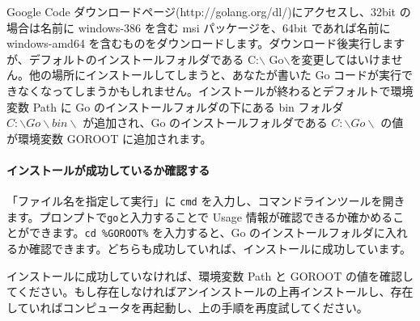 Google Code ダウンロードページ(http:\//\//golang.org\//dl\//)にアクセスし、32bit の場合は名前に windows-386 を含む msi パッケージを、64bit であれば名前に windows-amd64 を含むものをダウンロードします。ダウンロード後実行しますが、デフォルトのインストールフォルダである C:$\backslash$ Go$\backslash$を変更してはいけません。他の場所にインストールしてしまうと、あなたが書いた Go コードが実行できなくなってしまうかもしれません。インストールが終わるとデフォルトで環境変数 Path に Go のインストールフォルダの下にある bin フォルダ $C:\backslash Go\backslash bin\backslash$ が追加され、Go のインストールフォルダである $C:\backslash Go\backslash$ の値が環境変数 GOROOT に追加されます。

\paragraph{インストールが成功しているか確認する}


「ファイル名を指定して実行」に \texttt{cmd} を入力し、コマンドラインツールを開きます。プロンプトで\texttt{go}と入力することで Usage 情報が確認できるか確かめることができます。\texttt{cd \%GOROOT\%} を入力すると、Go のインストールフォルダに入れるか確認できます。どちらも成功していれば、インストールに成功しています。

インストールに成功していなければ、環境変数 Path と GOROOT の値を確認してください。もし存在しなければアンインストールの上再インストールし、存在していればコンピュータを再起動し、上の手順を再度試してください。

